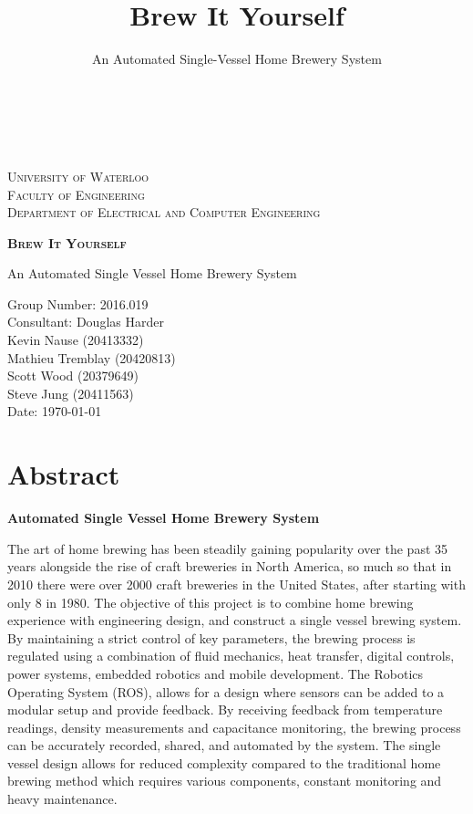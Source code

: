 \documentclass{article}
\author{\\\\}
\title{Brew It Yourself}
\subtitle{An Automated Single-Vessel Home Brewery System}
\begin{document}
\begin{titlepage}
    \begin{center}
        \vspace*{1cm}
        
        \textsc{\LARGE University of Waterloo}\\ [0.1cm]
        \textsc{\Large Faculty of Engineering}\\
        \textsc{Department of Electrical and Computer Engineering}

		\vspace{4.5cm}

        \textsc{\Huge \textbf{Brew It Yourself}}
        
        \vspace{0.2cm}
        An Automated Single Vessel Home Brewery System
                
        \vfill
        
        Group Number: 2016.019
		\\Consultant: Douglas Harder
        \vspace{0.5cm}
        \\Kevin Nause (20413332) 
        \\Mathieu Tremblay (20420813) 
        \\Scott Wood (20379649) 
        \\Steve Jung (20411563) 
        \vspace{0.5cm}
        \\Date: \today
        \vspace{3.0cm}
    \end{center}
\end{titlepage}

\justify
\onehalfspacing

\pagebreak
\section*{Abstract}

\textbf{Automated Single Vessel Home Brewery System}

The art of home brewing has been steadily gaining popularity over the past 35 years alongside
the rise of craft breweries in North America, so much so that in 2010 there were over 2000 craft
breweries in the United States, after starting with only 8 in 1980. The objective of this project is
to combine home brewing experience with engineering design, and construct a single vessel
brewing system. By maintaining a strict control of key parameters, the brewing process is
regulated using a combination of fluid mechanics, heat transfer, digital controls, power systems,
embedded robotics and mobile development. The Robotics Operating System (ROS), allows for
a design where sensors can be added to a modular setup and provide feedback. By receiving
feedback from temperature readings, density measurements and capacitance monitoring, the
brewing process can be accurately recorded, shared, and automated by the system. The single
vessel design allows for reduced complexity compared to the traditional home brewing method
which requires various components, constant monitoring and heavy maintenance.
\end{document}
